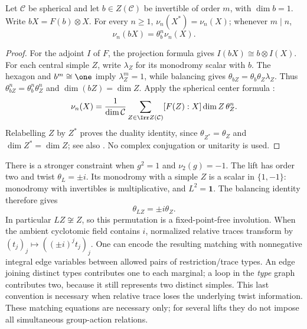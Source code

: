\begin{lemma}
\label{lem:central-invertible-indicators}
Let $\mathcal C$ be spherical and let $b\in Z(\mathcal C)$ be
invertible of order $m$, with $\dim b=1$. Write $bX=F(b)\otimes X$.
For every $n\ge1$, $\nu_n(X^*)=\nu_n(X)$; whenever $m\mid n$,
\[
 \nu_n(bX)=\theta_b^n\nu_n(X).
\]
\end{lemma}
\begin{proof}
For the adjoint $I$ of $F$, the projection formula gives
$I(bX)\cong b\otimes I(X)$. For each central simple $Z$, write
$\lambda_Z$ for its monodromy scalar with $b$. The hexagon and
$b^m\cong\one$ imply $\lambda_Z^m=1$, while balancing gives
$\theta_{bZ}=\theta_b\theta_Z\lambda_Z$. Thus
$\theta_{bZ}^n=\theta_b^n\theta_Z^n$ and $\dim(bZ)=\dim Z$.
Apply the spherical center formula \cite[Theorem~4.1]{NS}:
\[
 \nu_n(X)=\frac1{\dim\mathcal C}
 \sum_{Z\in\Irr Z(\mathcal C)}[F(Z):X]\dim Z\,\theta_Z^n.
\]
Relabelling $Z$ by $Z^*$ proves the duality identity, since
$\theta_{Z^*}=\theta_Z$ and $\dim Z^*=\dim Z$; see also
\cite[Remark~4.2]{NS}. No complex conjugation or unitarity is used.
\end{proof}

There is a stronger constraint when $g^2=1$ and $\nu_2(g)=-1$.
The lift has order two and twist $\theta_L=\pm i$. Its monodromy with a
simple $Z$ is a scalar in $\{1,-1\}$: monodromy with invertibles is
multiplicative, and $L^2=\mathbf1$. The balancing identity therefore gives
\[
 \theta_{LZ}=\pm i\theta_Z.
\]
In particular $LZ\not\cong Z$, so this permutation is a fixed-point-free
involution. When the ambient cyclotomic field contains $i$, normalized
relative traces transform by
$(t_j)_j\mapsto((\pm i)^j t_j)_j$.
One can encode the resulting matching with nonnegative integral edge
variables between allowed pairs of restriction/trace types. An edge
joining distinct types contributes one to each marginal; a loop in the
\emph{type} graph contributes two, because it still represents two distinct
simples. This last convention is necessary when relative trace loses the
underlying twist information. These matching equations are necessary only;
for several lifts they do not impose all simultaneous group-action
relations.
